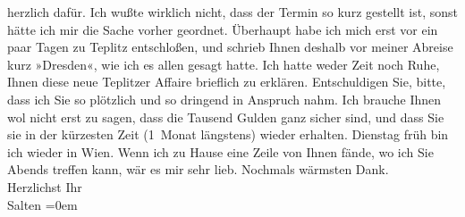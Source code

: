 \begin{ledgroupsized}[t]{13cm}
               herzlich dafür. Ich wußte wirklich nicht, dass der Termin so kurz gestellt ist, sonst
               hätte ich mir die Sache vorher geordnet. Überhaupt habe ich mich erst vor ein paar
               Tagen zu Teplitz entschloßen, und schrieb Ihnen
               deshalb vor meiner Abreise kurz »Dresden«, wie
               ich es allen gesagt hatte. Ich hatte {\pb}weder Zeit noch Ruhe, Ihnen
               diese neue Teplitzer Affaire brieflich zu
               erklären. Entschuldigen Sie, bitte, dass ich Sie so plötzlich und so dringend in
               Anspruch nahm. Ich brauche Ihnen wol nicht erst zu sagen, dass die Tausend Gulden
               ganz sicher sind, und dass Sie sie in der kürzesten Zeit (1 Monat längstens) wieder
               erhalten.\pend
           \pstart
           Dienstag früh bin ich wieder in Wien. Wenn ich zu Hause eine Zeile von Ihnen fände, wo ich Sie
                  Abends{ }{\pb}treffen kann, wär es mir sehr
               lieb.\pend
           \pstart
           Nochmals wärmsten Dank. {\\[\baselineskip]}Herzlichst Ihr {\\[\baselineskip]}\spacefill\mbox{Salten}\pend
           \leftskip=0em{}
         
         \endnumbering{}\end{ledgroupsized}  \newcommand{\dateiname}{L03291}\newcommand{\titel}{Felix Salten an Arthur Schnitzler, 6. 5. 1899}\newcommand{\editorInnen}{Martin Anton Müller und Laura Untner}
      